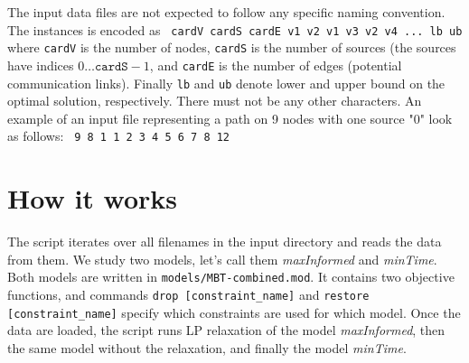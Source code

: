 \documentclass[12pt]{article}
\begin{document}
The input data files are not expected to follow any specific naming convention.
The instances is encoded as \newline\newline
\texttt{
cardV cardS cardE\newline
v1 v2\newline
v1 v3\newline
v2 v4\newline
...\newline
lb ub\newline\newline
}
where \texttt{cardV} is the number of nodes, \texttt{cardS} is the number of sources (the sources have indices $0\dots\texttt{cardS}-1$, 
and \texttt{cardE} is the number of edges (potential communication links).
Finally \texttt{lb} and \texttt{ub} denote lower and upper bound on the optimal solution, respectively.
There must not be any other characters.
An example of an input file representing a path on 9 nodes with one source "0" look as follows:\newline\newline
\texttt{
9	8	1	1	2	3	4	5	6	7	8	12\newline\newline
}

\section{How it works}

The script iterates over all filenames in the input directory and reads the data from them.
We study two models, let's call them \emph{maxInformed} and \emph{minTime}.
Both models are written in \texttt{models/MBT-combined.mod}.
It contains two objective functions, and commands \texttt{drop [constraint\_name]} and \texttt{restore [constraint\_name]} specify which constraints are used for which model. 
Once the data are loaded, the script runs LP relaxation of the model \emph{maxInformed}, then the same model without the relaxation, and finally the model \emph{minTime}.
\end{document}
